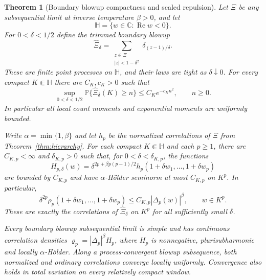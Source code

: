 \documentclass[11pt,a4paper]{article}
\numberwithin{equation}{section}
\newtheorem{theorem}{Theorem}[section]
\theoremstyle{definition}
\theoremstyle{remark}
\begin{document}
\begin{theorem}[Boundary blowup compactness and scaled repulsion]
\label{thm:boundary-blowup-compactness}
Let $\Xi$ be any subsequential limit at inverse temperature $\beta>0$,
and let
\[
 \mathbb H=\{w\in\mathbb C:\operatorname{Re}w<0\}.
\]
For $0<\delta<1/2$ define the trimmed boundary blowup
\begin{equation}\label{eq:trimmed-boundary-blowup}
 \widehat\Xi_\delta
 =\sum_{\substack{z\in\Xi\\ |z|<1-\delta^2}}
                  \delta_{(z-1)/\delta}.
\end{equation}
These are finite point processes on $\mathbb H$, and their laws are tight
as $\delta\downarrow0$. For every compact $K\Subset\mathbb H$ there
are $C_K,c_K>0$ such that
\begin{equation}\label{eq:boundary-blowup-count-tail}
 \sup_{0<\delta<1/2}
 \mathbb P\{\widehat\Xi_\delta(K)\ge n\}
 \le C_K e^{-c_K n^2},\qquad n\ge0.
\end{equation}
In particular all local count moments and exponential moments are
uniformly bounded.

Write $\alpha=\min\{1,\beta\}$ and let $h_p$ be the normalized
correlations of $\Xi$ from Theorem~\ref{thm:hierarchy}. For each compact
$K\Subset\mathbb H$ and each $p\ge1$, there are $C_{K,p}<\infty$ and
$\delta_{K,p}>0$ such that, for $0<\delta<\delta_{K,p}$, the functions
\[
 H_{p,\delta}(w)
 =\delta^{2p+\beta p(p-1)/2}
            h_p(1+\delta w_1,\ldots,1+\delta w_p)
\]
are bounded by $C_{K,p}$ and have $\alpha$-H\"older seminorm at most
$C_{K,p}$ on $K^p$. In particular,
\begin{equation}\label{eq:scaled-vandermonde-bound}
 \delta^{2p}\rho_p(1+\delta w_1,\ldots,1+\delta w_p)
 \le C_{K,p}|\Delta_p(w)|^\beta,
 \qquad w\in K^p.
\end{equation}
These are exactly the correlations of $\widehat\Xi_\delta$ on $K^p$
for all sufficiently small $\delta$.

Every boundary blowup subsequential limit is simple and has continuous
correlation densities $\varrho_p=|\Delta_p|^\beta H_p$, where $H_p$ is
nonnegative, plurisubharmonic and locally $\alpha$-H\"older. Along a
process-convergent blowup subsequence, both normalized and ordinary
correlations converge locally uniformly. Convergence also holds in
total variation on every relatively compact window.
\end{theorem}
\end{document}
